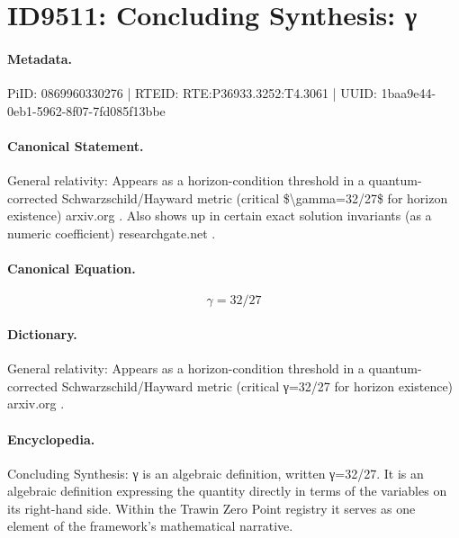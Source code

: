 \section*{ID9511: Concluding Synthesis: γ}
\paragraph{Metadata.}
PiID: 0869960330276 | RTEID: RTE:P36933.3252:T4.3061 | UUID: 1baa9e44-0eb1-5962-8f07-7fd085f13bbe

\paragraph{Canonical Statement.}
General relativity: Appears as a horizon-condition threshold in a quantum-corrected Schwarzschild/Hayward metric (critical \$\textbackslash{}gamma=32/27\$ for horizon existence) arxiv.org . Also shows up in certain exact solution invariants (as a numeric coefficient) researchgate.net .

\paragraph{Canonical Equation.}
\[
\gamma=32/27
\]

\paragraph{Dictionary.}
General relativity: Appears as a horizon-condition threshold in a quantum-corrected Schwarzschild/Hayward metric (critical γ=32/27 for horizon existence) arxiv.org .

\paragraph{Encyclopedia.}
Concluding Synthesis: γ is an algebraic definition, written γ=32/27. It is an algebraic definition expressing the quantity directly in terms of the variables on its right-hand side. Within the Trawin Zero Point registry it serves as one element of the framework's mathematical narrative.
